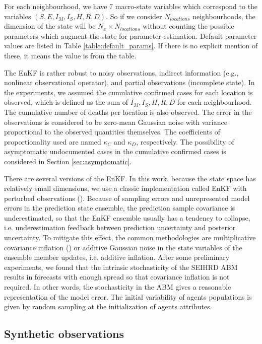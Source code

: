 \documentclass[11pt,a4paper]{article}
\begin{document}
For each neighbourhood, we have 7 macro-state variables which correspond to the variables $(S, E, I_M, I_S, H, R, D)$. So if we consider $N_{locations}$ neighbourhoods, the dimension of the state will be $N_x \times N_{locations}$ without counting the possible parameters which augment the state for parameter estimation. Default parameter values are listed in Table \ref{table:default_params}. If there is no explicit mention of these, it means the value is from the table. 

The EnKF is rather robust to noisy observations, indirect information (e.g., nonlinear observational operator), and partial observations (incomplete state). In the experiments, we assumed the cumulative confirmed cases for each location is observed, which is defined as the sum of $I_M, I_S, H, R, D$ for each neighbourhood. The cumulative number of deaths per location is also observed. The error in the observations is considered to be zero-mean Gaussian noise with variance proportional to the observed quantities themselves. The coefficients of proportionality used are named $\kappa_{C}$ and $\kappa_{D}$, respectively. The possibility of asymptomatic undocumented cases in the cumulative confirmed cases is considered in Section \ref{sec:asymptomatic}.

There are several versions of the EnKF. In this work, because the state space has relatively small dimensions, we use a classic implementation called  EnKF with perturbed observations (\cite{Burgers1998}). Because of sampling errors and unrepresented model errors in the prediction state ensemble, the prediction sample covariance is underestimated, so that  the EnKF ensemble usually has a tendency to collapse, i.e. underestimation feedback between prediction uncertainty and posterior uncertainty. To mitigate this effect, the common methodologies are multiplicative covariance inflation (\cite{Anderson1999, Miyoshi2011}) or additive Gaussian noise in the state variables of the ensemble member updates, i.e. additive inflation. After some preliminary experiments, we found that the intrinsic stochasticity of the SEIHRD ABM results in forecasts with enough spread so that covariance inflation is not required. In other words, the stochasticity in the ABM gives a reasonable representation of the model error. The initial variability of agents populations is given by random sampling at the initialization of agents attributes.

\subsection{Synthetic observations} \label{sec:synthetic}
\end{document}
